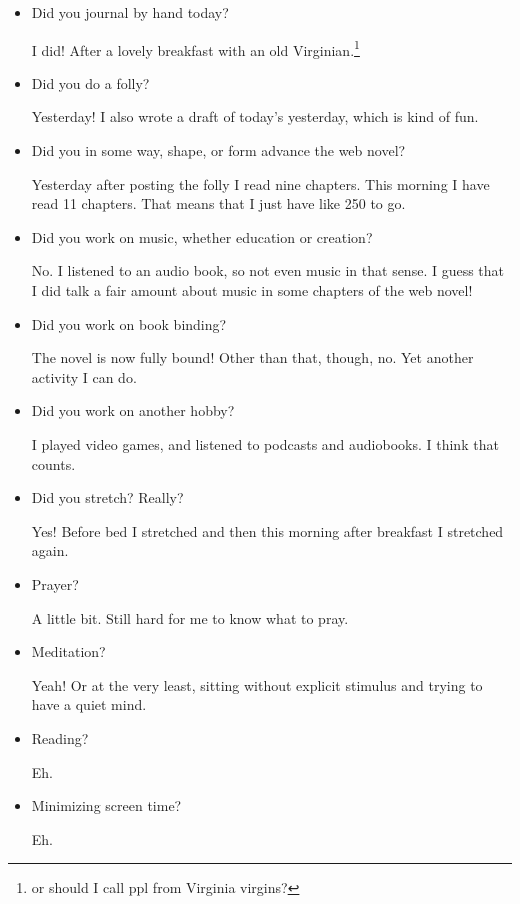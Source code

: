 \documentclass[12pt]{article}
\renewcommand{\,}{\textsuperscript{,}}
\begin{document}
\begin{itemize}

\item Did you journal by hand today?

I did! After a lovely breakfast with an old Virginian.\footnote{or should I call ppl from Virginia virgins?}

\item Did you do a folly?

Yesterday! I also wrote a draft of today's yesterday, which is kind of fun.

\item Did you in some way, shape, or form advance the web novel?

Yesterday after posting the folly I read nine chapters.
This morning I have read 11 chapters.
That means that I just have like 250 to go.

\item Did you work on music, whether education or creation?

No. I listened to an audio book, so not even music in that sense.
I guess that I did talk a fair amount about music in some chapters of the web novel!

\item Did you work on book binding?

The novel is now fully bound! Other than that, though, no.
Yet another activity I can do.

\item Did you work on another hobby?

I played video games, and listened to podcasts and audiobooks.
I think that counts.

\item Did you stretch? Really?

Yes! Before bed I stretched and then this morning after breakfast I stretched again.

\item Prayer?

A little bit.
Still hard for me to know what to pray.

\item Meditation?

Yeah! Or at the very least, sitting without explicit stimulus and trying to have a quiet mind.

\item Reading?

Eh.

\item Minimizing screen time?

Eh.
\end{itemize}
\end{document}
